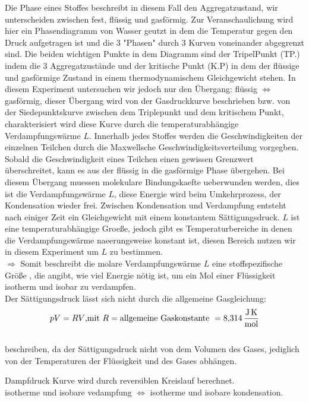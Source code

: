 Die \glqq Phase\grqq{} eines Stoffes beschreibt in diesem Fall den Aggregatzustand, wir unterscheiden zwischen fest, flüssig und gasförmig.
Zur Veranschaulichung wird hier ein Phasendiagramm von Wasser geutzt in dem die Temperatur gegen den Druck aufgetragen ist und die 3 "Phasen" 
durch 3 Kurven voneinander abgegrenzt sind. Die beiden wichtigen Punkte in dem Diagramm sind der TripelPunkt (TP.) indem die 
3 Aggregatzustände und der kritische Punkt (K.P) in dem der flüssige und gasförmige Zustand in einem 
thermodynamischem Gleichgewicht stehen.
In diesem Experiment untersuchen wir jedoch nur den Übergang: flüssig $\Leftrightarrow$ gasförmig, dieser Übergang wird von der 
Gasdruckkurve beschrieben bzw. von der Siedepunktskurve zwischen dem Triplepunkt und dem kritischem Punkt, charakterisiert wird diese 
Kurve durch die temperaturabhängige Verdampfungswärme $L$. Innerhalb jedes Stoffes werden die Geschwindigkeiten der einzelnen Teilchen
durch die Maxwellsche Geschwindigkeitsverteilung vorgegben. Sobald die Geschwindigkeit eines Teilchen einen gewissen Grenzwert 
überschreitet, kann es aus der flüssig in die gasförmige Phase übergehen. Bei diesem Übergang muessen molekulare Bindungskaefte ueberwunden
werden, dies ist die Verdampfungswärme $L$, diese Energie wird beim Umkehrprozess, der Kondensation wieder frei. Zwischen 
Kondensation und Verdampfung entsteht nach einiger Zeit ein Gleichgewicht mit einem konstantem Sättigungsdruck.
$L$ ist eine temperaturabhängige Groeße, jedoch gibt es Temperaturbereiche in denen die Verdampfungswärme naeerungsweise konstant ist, 
diesen Bereich nutzen wir in diesem Experiment um $L$ zu bestimmen.
\\$\Rightarrow$ Somit beschreibt die molare Verdampfungswärme $L$ eine stoffspezifische Größe , die angibt, wie viel Energie nötig ist,
um ein Mol einer Flüssigkeit isotherm und isobar zu verdampfen.\\
Der Sättigungsdruck lässt sich nicht durch die allgemeine Gasgleichung:
\begin{equation}
    pV=RV\text{,mit }R=\text{allgemeine Gaskonstante }= \SI{8.314}{\joule\per\mole\kelvin}\\
    \label{eqn:Gasgl}
\end{equation}
\\
beschreiben, da der Sättigungsdruck nicht von dem Volumen des Gases, jediglich von der Temperaturen der Flüssigkeit 
und des Gases abhängen.

Dampfdruck Kurve wird durch reversiblen Kreislauf berechnet.\\
isotherme und isobare vedampfung $\Leftrightarrow$ isotherme und isobare kondensation.\\

